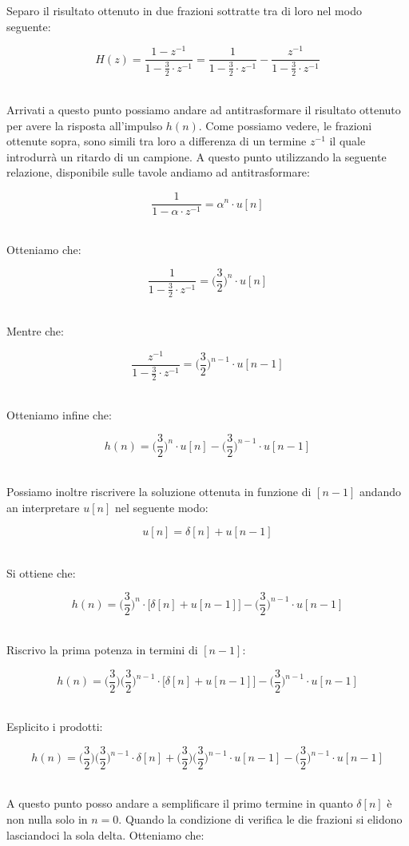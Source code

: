 \documentclass[../main.tex]{subfiles}
\begin{document}
Separo il risultato ottenuto in due frazioni sottratte tra di loro nel modo seguente:

\[ H(z) = \frac{1 - z^{-1} }{1 - \frac{3}{2}\cdot z^{-1}} = \frac{1}{1 - \frac{3}{2}\cdot z^{-1}} - \frac{z^{-1}}{1 - \frac{3}{2}\cdot z^{-1}}\]\

Arrivati a questo punto possiamo andare ad antitrasformare il risultato ottenuto per avere la risposta all'impulso $h(n)$.
Come possiamo vedere, le frazioni ottenute sopra, sono simili tra loro a differenza di un termine $z^{-1}$ il quale introdurrà un ritardo di un campione.
A questo punto utilizzando la seguente relazione, disponibile sulle tavole andiamo ad antitrasformare:

\[ \frac{1}{1 - \alpha \cdot z^{-1}} = \alpha^n \cdot u[n]  \]\

Otteniamo che:

\[ \frac{1}{1 - \frac{3}{2} \cdot z^{-1}} = \bigg( \frac{3}{2}\bigg)^n  \cdot u[n]  \]\

Mentre che:

\[ \frac{z^{-1}}{1 - \frac{3}{2} \cdot z^{-1}} = \bigg( \frac{3}{2}\bigg)^{n-1}  \cdot u[n-1]  \]\

Otteniamo infine che:

\[ h(n) = \bigg(\frac{3}{2}\bigg)^n  \cdot u[n] - \bigg(\frac{3}{2}\bigg)^{n-1}  \cdot u[n-1] \]\

Possiamo inoltre riscrivere la soluzione ottenuta in funzione di $[n-1]$ andando an interpretare $u[n]$ nel seguente modo:

\[  u[n] = \delta[n] + u[n-1]  \]\

Si ottiene che:

\[ h(n) = \bigg(\frac{3}{2}\bigg)^n  \cdot \big[  \delta[n] + u[n-1]  \big] - \bigg(\frac{3}{2}\bigg)^{n-1}  \cdot u[n-1] \]\

Riscrivo la prima potenza in termini di $[n-1]$:

\[ h(n) = \bigg(\frac{3}{2}\bigg)\bigg(\frac{3}{2}\bigg)^{n-1} \cdot \big[  \delta[n] + u[n-1]  \big] - \bigg(\frac{3}{2}\bigg)^{n-1}  \cdot u[n-1]   \]\

Esplicito i prodotti:

\[ h(n) = \bigg(\frac{3}{2}\bigg)\bigg(\frac{3}{2}\bigg)^{n-1} \cdot  \delta[n] + \bigg(\frac{3}{2}\bigg)\bigg(\frac{3}{2}\bigg)^{n-1} \cdot  u[n-1]  - \bigg(\frac{3}{2}\bigg)^{n-1}  \cdot u[n-1]  \]\

A questo punto posso andare a semplificare il primo termine in quanto $\delta[n]$ è non nulla solo in $n = 0$. Quando la condizione di verifica le die frazioni si elidono lasciandoci la sola delta. Otteniamo che:
\end{document}
